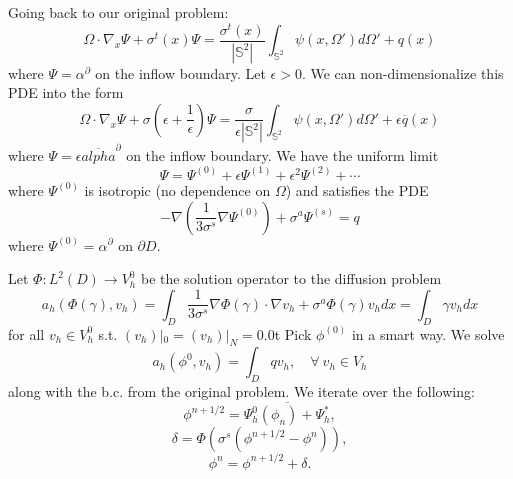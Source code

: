 \documentclass{article}
\theoremstyle{definition}
\theoremstyle{definition}
\begin{document}
Going back to our original problem:
$$\Omega\cdot \nabla_x \Psi+\sigma^t(x)\Psi=\frac{\sigma^t(x)}{|\mathbb{S}^2|}\int_{\mathbb{S}^2}\psi(x,\Omega')d\Omega'+q(x)$$
where
$\Psi=\alpha^{\partial}$ on the inflow boundary. Let $\epsilon>0$. We can non-dimensionalize this PDE into the form
$$\Omega\cdot \nabla_x \Psi+\sigma\left(\epsilon+\frac{1}{\epsilon}\right)\Psi=\frac{\sigma}{\epsilon|\mathbb{S}^2|}\int_{\mathbb{S}^2}\psi(x,\Omega')d\Omega'+\epsilon \overline{q}(x)$$
where $\Psi=\epsilon \overline{alpha}^{\partial}$ on the inflow boundary. We have the uniform limit
$$\Psi=\Psi^{(0)}+\epsilon \Psi^{(1)}+\epsilon^2\Psi^{(2)}+\cdots$$
where $\Psi^{(0)}$ is isotropic (no dependence on $\Omega$) and satisfies the PDE
$$-\nabla \left(\frac{1}{3\sigma^{s}}\nabla \Psi^{(0)}\right)+\sigma^{a}\Psi^{(s)}=q$$
where $\Psi^{(0)}=\alpha^{\partial}$ on $\partial D$.

Let $\Phi:L^2(D)\to V^0_h$ be the solution operator to the diffusion problem 
$$a_h(\Phi(\gamma),v_h)=\int_{D}\frac{1}{3\sigma^{s}}\nabla \Phi(\gamma)\cdot \nabla v_h+\sigma^{a}\Phi(\gamma)v_hdx=\int_{D}\gamma v_hdx$$
for all $v_h\in V^0_h$ s.t. $(v_h)|_0=(v_h)|_N=0$.0t Pick $\phi^{(0)}$ in a smart way. We solve 
$$a_h(\phi^{0},v_h)=\int_{D}qv_h,\quad \forall\:v_h\in V_h$$
along with the b.c. from the original problem. We iterate over the following:
$$\phi^{n+1/2}=\overline{\Psi_h^{0}(\phi_n)+\Psi_h^{*}},$$
$$\delta=\Phi(\sigma^{s}(\phi^{n+1/2}-\phi^{n})),$$
$$\phi^{n}=\phi^{n+1/2}+\delta.$$
\end{document}
